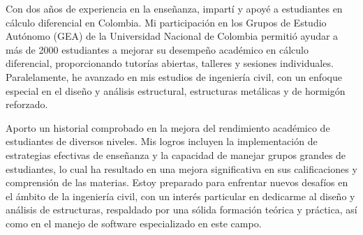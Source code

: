 

\begin{cvparagraph}

Con dos años de experiencia en la enseñanza, impartí y apoyé a estudiantes en cálculo diferencial en Colombia. Mi
participación en los Grupos de Estudio Autónomo (GEA) de la Universidad Nacional de Colombia permitió ayudar a más de
2000 estudiantes a mejorar su desempeño académico en cálculo diferencial, proporcionando tutorías abiertas, talleres y
sesiones individuales. Paralelamente, he avanzado en mis estudios de ingeniería civil, con un enfoque especial en el diseño y
análisis estructural, estructuras metálicas y de hormigón reforzado.

Aporto un historial comprobado en la mejora del rendimiento académico de estudiantes de diversos niveles. Mis logros
incluyen la implementación de estrategias efectivas de enseñanza y la capacidad de manejar grupos grandes de
estudiantes, lo cual ha resultado en una mejora significativa en sus calificaciones y comprensión de las materias. Estoy
preparado para enfrentar nuevos desafíos en el ámbito de la ingeniería civil, con un interés particular en dedicarme al
diseño y análisis de estructuras, respaldado por una sólida formación teórica y práctica, así como en el manejo de software
especializado en este campo.
\end{cvparagraph}